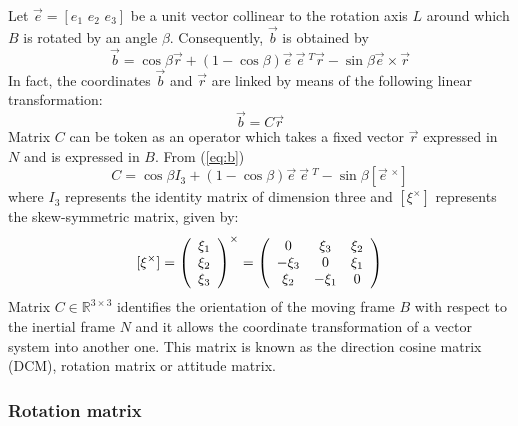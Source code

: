  Let $\vec{e} = [e_1\,\, e_2\,\, e_3]$ be a unit vector collinear to the rotation axis $L$ around which $B$ is rotated by an angle $\beta$. Consequently, $\vec{b}$ is obtained by
 \begin{equation}\label{eq:b}
 \vec{b} = \cos \beta \vec{r} + (1 - \cos \beta)\vec{e}\ \vec{e}\ ^T\vec{r} - \sin\beta\vec{e} \times \vec{r}
 \end{equation}
 In fact, the coordinates $\vec{b}$ and $\vec{r}$ are linked by means of the following linear transformation:
 \begin{equation}
 \vec{b} = C\vec{r}
 \end{equation}
 Matrix $C$ can be token as an operator which takes a fixed vector $\vec{r}$ expressed in $N$ and is expressed in $B$. From (\ref{eq:b})
 \begin{equation}
 C = \cos\beta I_3 + (1 - \cos\beta)\vec{e}\ \vec{e}\ ^T - \sin\beta[\vec{e}\ ^\times]
 \end{equation} where $I_3$ represents the identity matrix of dimension three and $[\xi^\times]$ represents the skew-symmetric matrix, given by:
 \begin{equation}\label{skew}
   [\xi^\times]=\left(\begin{array}{c}
                  \xi_1 \\
                  \xi_2 \\
                  \xi_3
                \end{array}\right)^\times=\left(
                                                  \begin{array}{ccc}
                                                    0 & \xi_3 & \-\xi_2 \\
                                                    -\xi_3 & 0 & \xi_1 \\
                                                    \xi_2 & -\xi_1 & 0 \\
                                                  \end{array}\right)
 \end{equation}
 Matrix $C \in \mathbb{R}^{3\times3}$ identifies the orientation of the moving frame $B$ with respect to the inertial frame $N$ and it allows the coordinate transformation of a vector system into another one. This matrix is known as the direction cosine matrix (DCM), rotation matrix or attitude matrix.

 \subsubsection{Rotation matrix}

